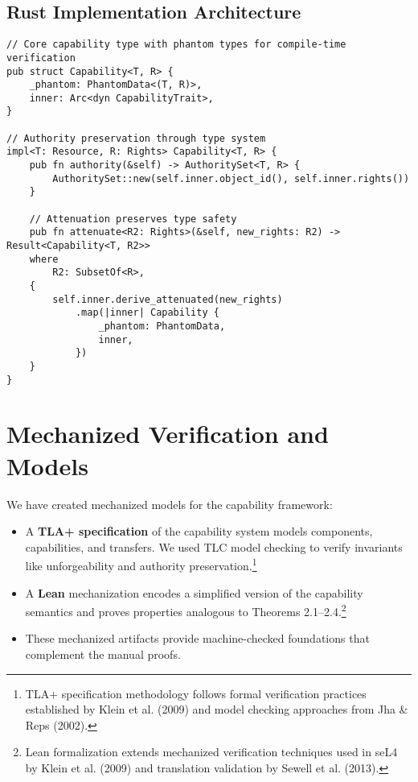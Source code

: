 \subsection{Rust Implementation Architecture}

\begin{lstlisting}[style=rust]
// Core capability type with phantom types for compile-time verification
pub struct Capability<T, R> {
    _phantom: PhantomData<(T, R)>,
    inner: Arc<dyn CapabilityTrait>,
}

// Authority preservation through type system
impl<T: Resource, R: Rights> Capability<T, R> {
    pub fn authority(&self) -> AuthoritySet<T, R> {
        AuthoritySet::new(self.inner.object_id(), self.inner.rights())
    }
    
    // Attenuation preserves type safety
    pub fn attenuate<R2: Rights>(&self, new_rights: R2) -> Result<Capability<T, R2>>
    where
        R2: SubsetOf<R>,
    {
        self.inner.derive_attenuated(new_rights)
            .map(|inner| Capability {
                _phantom: PhantomData,
                inner,
            })
    }
}
\end{lstlisting}

\section{Mechanized Verification and Models}

We have created mechanized models for the capability framework:

\begin{itemize}
\item A \textbf{TLA+ specification} of the capability system models components, capabilities, and transfers. We used TLC model checking to verify invariants like unforgeability and authority preservation.\footnote{TLA+ specification methodology follows formal verification practices established by Klein et al. (2009) and model checking approaches from Jha \& Reps (2002).}
\item A \textbf{Lean} mechanization encodes a simplified version of the capability semantics and proves properties analogous to Theorems 2.1–2.4.\footnote{Lean formalization extends mechanized verification techniques used in seL4 by Klein et al. (2009) and translation validation by Sewell et al. (2013).}
\item These mechanized artifacts provide machine-checked foundations that complement the manual proofs.
\end{itemize}

